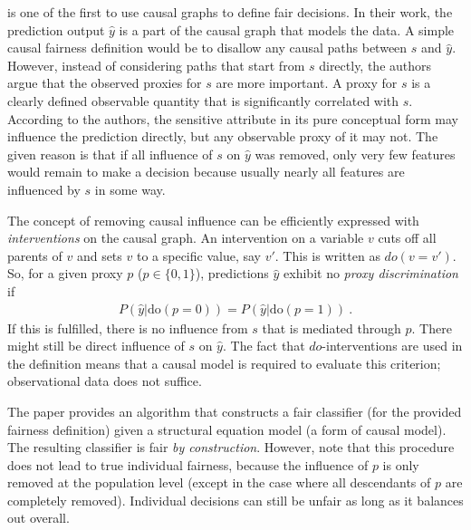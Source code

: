 
\citet{kilbertus2017avoiding} is one of the first to use causal graphs to define fair decisions.
In their work, the prediction output \(\hat{y}\) is a part of the causal graph that models the data.
A simple causal fairness definition would be to disallow any causal paths between \(s\) and \(\hat{y}\).
However, instead of considering paths that start from \(s\) directly,
the authors argue that the observed proxies for \(s\) are more important.
A proxy for \(s\) is a clearly defined observable quantity
that is significantly correlated with \(s\).
According to the authors,
the sensitive attribute in its pure conceptual form may influence the prediction directly,
but any observable proxy of it may not.
The given reason is that if all influence of \(s\) on \(\hat{y}\) was removed,
only very few features would remain to make a decision
because usually nearly all features are influenced by \(s\) in some way.

The concept of removing causal influence
can be efficiently expressed with \emph{interventions} on the causal graph.
An intervention on a variable \(v\) cuts off all parents of \(v\)
and sets \(v\) to a specific value, say \(v'\).
This is written as \(do(v=v')\).
So, for a given proxy \(p\) (\(p \in \{0, 1\}\)),
predictions \(\hat{y}\) exhibit no \emph{proxy discrimination} if
\begin{align}
  \label{eq:proxy-discrimination}
  P(\hat{y} | \text{do}(p=0)) = P(\hat{y}|\text{do}(p=1))~.
\end{align}
If this is fulfilled, there is no influence from \(s\) that is mediated through \(p\).
There might still be direct influence of \(s\) on \(\hat{y}\).
The fact that \(do\)-interventions are used in the definition means
that a causal model is required to evaluate this criterion; observational data does not suffice.

The paper provides an algorithm that constructs a fair classifier (for the provided fairness definition)
given a structural equation model (a form of causal model).
The resulting classifier is fair \emph{by construction}.
However, note that this procedure does not lead to true individual fairness,
because the influence of \(p\) is only removed at the population level
(except in the case where all descendants of \(p\) are completely removed).
Individual decisions can still be unfair as long as it balances out overall.

